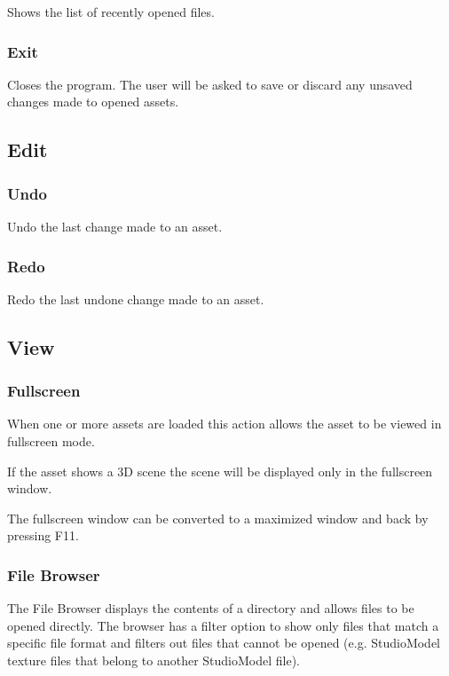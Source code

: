 \documentclass[10pt, a4paper, titlepage, oneside]{article}
\begin{document}
Shows the list of recently opened files.

\subsubsection{Exit}

Closes the program. The user will be asked to save or discard any unsaved changes made to opened assets.

\newpage

\subsection{Edit}

\subsubsection{Undo}

Undo the last change made to an asset.

\subsubsection{Redo}

Redo the last undone change made to an asset.

\subsection{View}

\subsubsection{Fullscreen}

When one or more assets are loaded this action allows the asset to be viewed in fullscreen mode.

If the asset shows a 3D scene the scene will be displayed only in the fullscreen window.

The fullscreen window can be converted to a maximized window and back by pressing F11.

\subsubsection{File Browser}

The File Browser displays the contents of a directory and allows files to be opened directly.
The browser has a filter option to show only files that match a specific file format and filters out files that cannot be opened (e.g. StudioModel texture files that belong to another StudioModel file).
\end{document}
